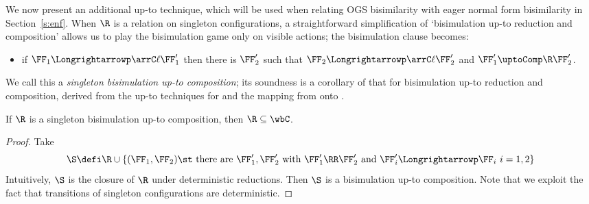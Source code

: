 \noindent
We now present an additional up-to technique, 
which will be used when relating 
OGS bisimilarity with eager normal form bisimilarity in Section~\ref{s:enf}.
When $\R$ is a relation on singleton configurations, 
a straightforward simplification 
of `bisimulation up-to reduction and composition'
allows us to play the bisimulation game only on visible actions;
the bisimulation clause becomes: 
\begin{itemize}
\item
 if $\FF_1 \Longrightarrowp\arrC\ell \FF_1'  $ then there is $\FF_2' $ such that 
$\FF_2\Longrightarrowp\arrC\ell \FF_2'  $ and 
$\FF'_1 \uptoComp \R \FF'_2$.
\end{itemize} 
We call this a \emph{singleton bisimulation up-to composition}; 
its soundness is a corollary of that for bisimulation   
up-to reduction and  composition, 
derived from the up-to techniques for \piI and the
mapping from \COGS  onto \piI. 



\begin{proposition}
\label{p:sing_bis}
If $\R$ is a singleton bisimulation up-to composition, then ${\R} \subseteq {\wbC}$.
\end{proposition} 

\begin{proof}
 Take 
$$\S \defi \R \cup \{ (\FF_1,\FF_2) \st 
\mbox{ there are } \FF'_1, \FF'_2  \mbox{ with } \FF'_1 \RR \FF'_2 
\mbox{ and   }\FF'_i \Longrightarrowp \FF_i  \mbox{ $i=1,2$}  \}
$$
Intuitively,  $\S$  is the closure of $\R$ under deterministic reductions. 
Then $\S$ is a bisimulation up-to composition.
Note that we exploit the fact that transitions of singleton configurations are deterministic.
\end{proof} 


\DSOCTe

